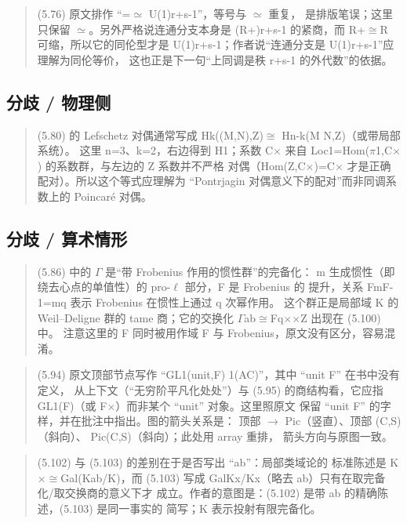 \begin{quote}\small
(5.76) 原文排作 “=$\simeq$ U(1)r+s-1”，等号与 $\simeq$ 重复， 是排版笔误；这里只保留 $\simeq$。另外严格说连通分支本身是 (R+)r+s-1 的紧商，而 R+$\cong$R 可缩，所以它的同伦型才是 U(1)r+s-1；作者说“连通分支是 U(1)r+s-1”应理解为同伦等价， 这也正是下一句“上同调是秩 r+s-1 的外代数”的依据。
\end{quote}

\subsection*{分歧 / 物理侧}
\begin{quote}\small
(5.80) 的 Lefschetz 对偶通常写成 Hk((M,N),Z)$\cong$ Hn-k(M N,Z)（或带局部系统）。 这里 n=3、k=2，右边得到 H1；系数 C$\times$ 来自 Loc1=Hom($\pi$1,C$\times$) 的系数群，与左边的 Z 系数并不严格 对偶（Hom(Z,C$\times$)=C$\times$ 才是正确配对）。所以这个等式应理解为 “Pontrjagin 对偶意义下的配对”而非同调系数上的 Poincaré 对偶。
\end{quote}

\subsection*{分歧 / 算术情形}
\begin{quote}\small
(5.86) 中的 $\Gamma$ 是“带 Frobenius 作用的惯性群”的完备化： m 生成惯性（即绕去心点的单值性）的 pro-$\ell$ 部分，F 是 Frobenius 的 提升，关系 FmF-1=mq 表示 Frobenius 在惯性上通过 q 次幂作用。 这个群正是局部域 K 的 Weil--Deligne 群的 tame 商；它的交换化 $\Gamma$ab$\cong$Fq$\times$$\times$Z 出现在 (5.100) 中。 注意这里的 F 同时被用作域 F 与 Frobenius，原文没有区分，容易混淆。
\end{quote}

\begin{quote}\small
(5.94) 原文顶部节点写作 “GL1(unit,F) 1(AC)”，其中 “unit F” 在书中没有定义， 从上下文（“无穷阶平凡化处处”）与 (5.95) 的商结构看，它应指 GL1(F)（或 F$\times$）而非某个 “unit” 对象。这里照原文 保留 “unit F” 的字样，并在批注中指出。图的箭头关系是： 顶部 $\to$ Pic（竖直）、顶部 (C,S)（斜向）、 Pic(C,S)（斜向）；此处用 array 重排， 箭头方向与原图一致。
\end{quote}

\begin{quote}\small
(5.102) 与 (5.103) 的差别在于是否写出 “ab”：局部类域论的 标准陈述是 K$\times$$\cong$Gal(Kab/K)，而 (5.103) 写成 GalKx/Kx（略去 ab）只有在取完备化/取交换商的意义下才 成立。作者的意图是：(5.102) 是带 ab 的精确陈述，(5.103) 是同一事实的 简写；K 表示投射有限完备化。
\end{quote}

